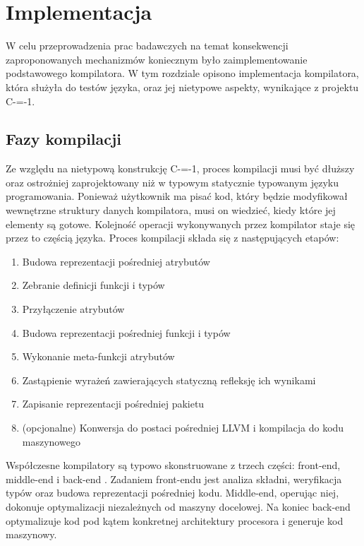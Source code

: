 \section{Implementacja}
\label{implementation}
W celu przeprowadzenia prac badawczych na temat konsekwencji zaproponowanych mechanizmów koniecznym było zaimplementowanie podstawowego kompilatora. 
W tym rozdziale opisono implementacja kompilatora, która służyła do testów języka, oraz jej nietypowe aspekty, wynikające z projektu C-=-1.

\subsection{Fazy kompilacji}
\label{Compilation_phases}
Ze względu na nietypową konstrukcję C-=-1, proces kompilacji musi być dłuższy oraz ostrożniej zaprojektowany niż w typowym statycznie typowanym języku programowania.
Ponieważ użytkownik ma pisać kod, który będzie modyfikował wewnętrzne struktury danych kompilatora, musi on wiedzieć, kiedy które jej elementy są gotowe.
Kolejność operacji wykonywanych przez kompilator staje się przez to częścią języka.
Proces kompilacji składa się z następujących etapów:
\begin{enumerate}
  \item Budowa reprezentacji pośredniej atrybutów
  \item Zebranie definicji funkcji i typów
  \item\label{compilation_step:attribute_attachment} Przyłączenie atrybutów
  \item Budowa reprezentacji pośredniej funkcji i typów
  \item Wykonanie meta-funkcji atrybutów
  \item Zastąpienie wyrażeń zawierających statyczną refleksję ich wynikami
  \item Zapisanie reprezentacji pośredniej pakietu
  \item (opcjonalne) Konwersja do postaci pośredniej LLVM i kompilacja do kodu maszynowego
\end{enumerate}

Współczesne kompilatory są typowo skonstruowane z trzech części: front-end, middle-end i back-end \cite{intro_to_compiler_design}.
Zadaniem front-endu jest analiza składni, weryfikacja typów oraz budowa reprezentacji pośredniej kodu. Middle-end, operując niej, dokonuje optymalizacji niezależnych od maszyny docelowej.
Na koniec back-end optymalizuje kod pod kątem konkretnej architektury procesora i generuje kod maszynowy.

